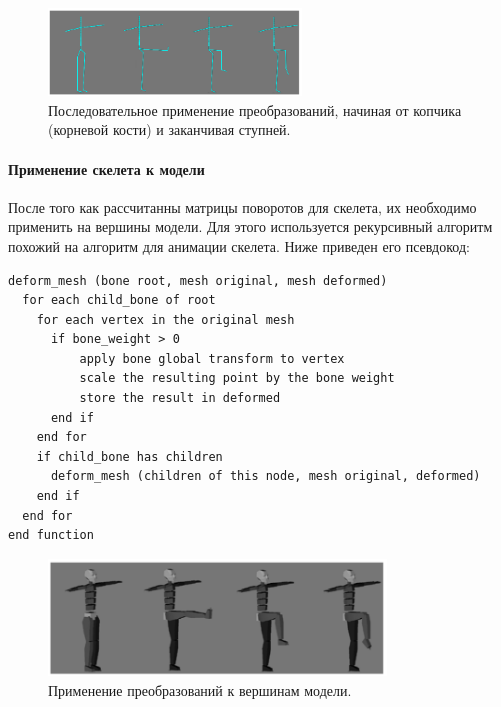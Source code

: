 \begin{figure}[h!]
    \centering
    \includegraphics[width=0.6\textwidth]{forward_kinematics_skeleton.png}
    \caption{\small{Последовательное применение преобразований, начиная от копчика (корневой кости) и заканчивая ступней.}}
\end{figure}


\paragraph{Применение скелета к модели}

После того как рассчитанны матрицы поворотов для скелета, их необходимо применить на вершины модели.
Для этого используется рекурсивный алгоритм похожий на алгоритм для анимации скелета. Ниже приведен его псевдокод:

\begin{small}
\begin{verbatim}
deform_mesh (bone root, mesh original, mesh deformed)
  for each child_bone of root
    for each vertex in the original mesh
      if bone_weight > 0
          apply bone global transform to vertex
          scale the resulting point by the bone weight
          store the result in deformed
      end if
    end for
    if child_bone has children
      deform_mesh (children of this node, mesh original, deformed)
    end if
  end for
end function
\end{verbatim}
\end{small}

\begin{figure}[h!]
    \centering
    \includegraphics[width=0.8\textwidth]{forward_kinematics.png}
    \caption{\small{Применение преобразований к вершинам модели.}}

\end{figure}



